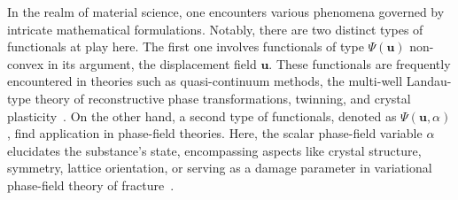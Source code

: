 In the realm of material science, one encounters various phenomena governed by intricate mathematical formulations. Notably, there are two distinct types of functionals at play here. The first one involves functionals of type $\Psi(\mathbf u)$ non-convex in its argument, the displacement field $\mathbf u$. These functionals are frequently encountered in theories such as quasi-continuum methods, the multi-well Landau-type theory of reconstructive phase transformations, twinning, and crystal plasticity~\cite{Tadmor1996-qi,Conti2004-yj,Clayton2011-xq,Baggio2019-rs,Baggio2023-qu}. On the other hand, a second type of functionals, denoted as $\Psi(\mathbf u, \alpha)$, find application in phase-field theories. Here, the scalar phase-field variable $\alpha$ elucidates the substance's state, encompassing aspects like crystal structure, symmetry, lattice orientation, \cite{Finel2010-zw,Ruffini2015-pn,Javanbakht2016-dr} or serving as a damage parameter in variational phase-field theory of fracture~\cite{francfort_marigo1998,Salman2021-mn}. 

